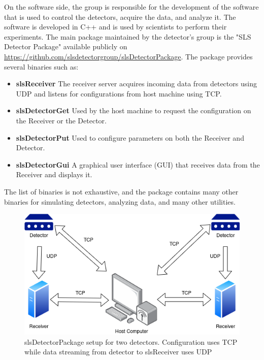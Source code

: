 \begin{spacing}{1.2}
    On the software side, the group is responsible for the development of the software that is used to control the detectors, acquire the data, and analyze it.
    The software is developed in C++ and is used by scientists to perform their experiments.
    The main package maintained by the detector's group is the "SLS Detector Package" available publicly
    on \url{https://github.com/slsdetectorgroup/slsDetectorPackage}. The package provides several binaries such as:
    \begin{itemize}
        \item \textbf{slsReceiver} The receiver server acquires incoming data from detectors using UDP and listens for configurations from host machine using TCP.
        \item \textbf{slsDetectorGet} Used by the host machine to request the configuration on the Receiver or the Detector.
        \item \textbf{slsDetectorPut} Used to configure parameters on both the Receiver and Detector.
        \item \textbf{slsDetectorGui} A graphical user interface (GUI) that receives data from the Receiver and displays it.
    \end{itemize}
    The list of binaries is not exhaustive, and the package contains many other binaries for simulating detectors, analyzing data, and many other utilities.

    \begin{figure}[h]
        \centering
        \includegraphics[scale=0.8]{Chapitre1/figures/slsreceiver.png}
        \caption{slsDetectorPackage setup for two detectors. Configuration uses TCP while
            data streaming from detector to slsReceiver uses UDP}
        \label{fig:detector}
    \end{figure}


\end{spacing}
